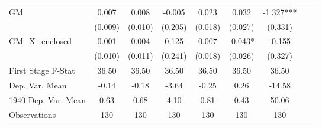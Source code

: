 \begin{tabular}{l*{8}{c}}
GM              &    0.007   &    0.008   &   -0.005   &    0.023   &    0.032   &   -1.327***\\
                &  (0.009)   &  (0.010)   &  (0.205)   &  (0.018)   &  (0.027)   &  (0.331)   \\
\addlinespace
GM\_X\_enclosed   &    0.001   &    0.004   &    0.125   &    0.007   &   -0.043*  &   -0.155   \\
                &  (0.010)   &  (0.011)   &  (0.241)   &  (0.018)   &  (0.026)   &  (0.327)   \\
\midrule
First Stage F-Stat&    36.50   &    36.50   &    36.50   &    36.50   &    36.50   &    36.50   \\
Dep. Var. Mean  &    -0.14   &    -0.18   &    -3.64   &    -0.25   &     0.26   &   -14.58   \\
1940 Dep. Var. Mean&     0.63   &     0.68   &     4.10   &     0.81   &     0.43   &    50.06   \\
Observations    &      130   &      130   &      130   &      130   &      130   &      130   \\
       \bottomrule \end{tabular}
